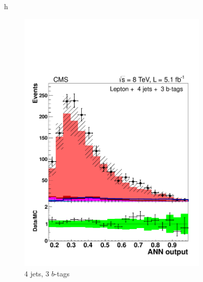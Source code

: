 \begin{figure}{h}
\begin{subfigure}[h]{0.31\textwidth}
        \includegraphics[width=\textwidth]{Figures/Analysis_1_Diagrams/d2MCPlots_CFMlpANN_cut4_j4_t3_Combined_HtWgt.pdf}
        \caption{4 jets, 3 $b$-tags}\label{lj_ANNoutput_8TeV_2}
      \end{subfigure}
      ~ %
      \begin{subfigure}[h]{0.31\textwidth}

\end{subfigure}
\end{figure}

